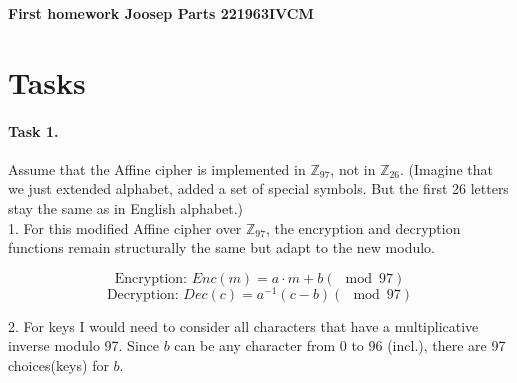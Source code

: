 \documentclass{article}
\begin{document}
\begin{tcolorbox}[colframe=ttblue, colback=ttblue!10]
\begin{center}
\begin{large}
\textbf{First homework Joosep Parts 221963IVCM}
\end{large}
\end{center}
\end{tcolorbox}

\section*{Tasks}

\paragraph{Task 1.} Assume that the Affine cipher is implemented in $\mathbb{Z}_{97}$, not in $\mathbb{Z}_{26}$. (Imagine that we just
extended alphabet, added a set of special symbols. But the first 26 letters stay the same as in English alphabet.)\\

1. For this modified Affine cipher over \( \mathbb{Z}_{97} \), the encryption and decryption functions remain structurally the same but
adapt to the new modulo.

$$\text{Encryption: } Enc(m) = a\cdot m + b (\mod 97)$$
$$\text{Decryption: } Dec(c) = a^{-1}(c - b) (\mod 97)$$


2. For keys I would need to consider all characters that have a multiplicative inverse modulo 97. Since $b$ can be any character from 0
to 96 (incl.), there are 97 choices(keys) for $b$.\\
\end{document}
